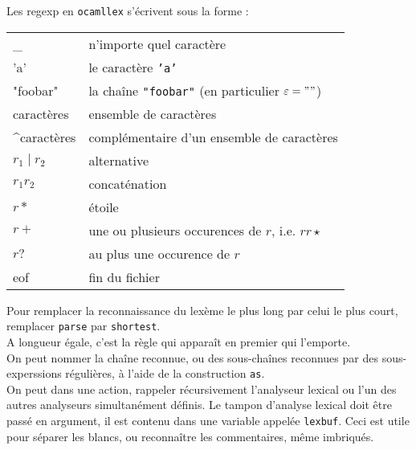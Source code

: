 \documentclass{cours}
\begin{document}
Les regexp en \texttt{ocamllex} s'écrivent sous la forme :
\begin{center}
    \begin{tabular}{>{\texttt{}}ll}
        \toprule
        \_                             & n'importe quel caractère                                     \\
        'a'                            & le caractère \texttt{'a'}                                    \\
        "foobar"                       & la chaîne \texttt{"foobar"} (en particulier $\epsilon = ""$) \\
        \text{[}caractères\text{]}     & ensemble de caractères                                       \\
        \text{[}\^{}caractères\text{]} & complémentaire d'un ensemble de caractères                   \\
        $r_{1} \mid r_{2}$             & alternative                                                  \\
        $r_{1}r_{2}$                   & concaténation                                                \\
        $r *$                          & étoile                                                       \\
        $r + $                         & une ou plusieurs occurences de $r$, i.e. $r r\star$          \\
        $r?$                           & au plus une occurence de $r$                                 \\
        eof                            & fin du fichier                                               \\
        \bottomrule
    \end{tabular}
\end{center}
Pour remplacer la reconnaissance du lexème le plus long par celui le plus court, remplacer \texttt{parse} par \texttt{shortest}.\\
A longueur égale, c'est la règle qui apparaît en premier qui l'emporte. \\
On peut nommer la chaîne reconnue, ou des sous-chaînes reconnues par des sous-experssions régulières, à l'aide de la construction \texttt{as}.\\
On peut dans une action, rappeler récursivement l'analyseur lexical ou l'un des autres analyseurs simultanément définis. Le tampon d'analyse lexical doit être passé en argument, il est contenu dans une variable appelée \texttt{lexbuf}. Ceci est utile pour séparer les blancs, ou reconnaître les commentaires, même imbriqués. \\
\end{document}
